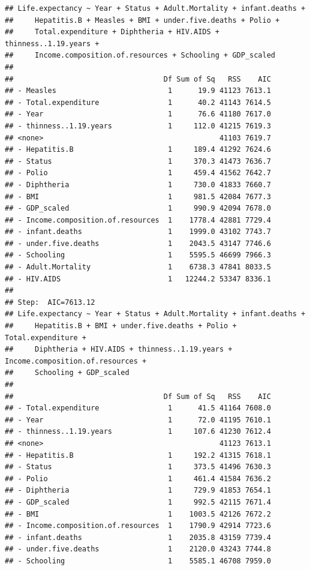 \documentclass[
]{article}
\begin{document}
\begin{verbatim}
## Life.expectancy ~ Year + Status + Adult.Mortality + infant.deaths + 
##     Hepatitis.B + Measles + BMI + under.five.deaths + Polio + 
##     Total.expenditure + Diphtheria + HIV.AIDS + thinness..1.19.years + 
##     Income.composition.of.resources + Schooling + GDP_scaled
## 
##                                   Df Sum of Sq   RSS    AIC
## - Measles                          1      19.9 41123 7613.1
## - Total.expenditure                1      40.2 41143 7614.5
## - Year                             1      76.6 41180 7617.0
## - thinness..1.19.years             1     112.0 41215 7619.3
## <none>                                         41103 7619.7
## - Hepatitis.B                      1     189.4 41292 7624.6
## - Status                           1     370.3 41473 7636.7
## - Polio                            1     459.4 41562 7642.7
## - Diphtheria                       1     730.0 41833 7660.7
## - BMI                              1     981.5 42084 7677.3
## - GDP_scaled                       1     990.9 42094 7678.0
## - Income.composition.of.resources  1    1778.4 42881 7729.4
## - infant.deaths                    1    1999.0 43102 7743.7
## - under.five.deaths                1    2043.5 43147 7746.6
## - Schooling                        1    5595.5 46699 7966.3
## - Adult.Mortality                  1    6738.3 47841 8033.5
## - HIV.AIDS                         1   12244.2 53347 8336.1
## 
## Step:  AIC=7613.12
## Life.expectancy ~ Year + Status + Adult.Mortality + infant.deaths + 
##     Hepatitis.B + BMI + under.five.deaths + Polio + Total.expenditure + 
##     Diphtheria + HIV.AIDS + thinness..1.19.years + Income.composition.of.resources + 
##     Schooling + GDP_scaled
## 
##                                   Df Sum of Sq   RSS    AIC
## - Total.expenditure                1      41.5 41164 7608.0
## - Year                             1      72.0 41195 7610.1
## - thinness..1.19.years             1     107.6 41230 7612.4
## <none>                                         41123 7613.1
## - Hepatitis.B                      1     192.2 41315 7618.1
## - Status                           1     373.5 41496 7630.3
## - Polio                            1     461.4 41584 7636.2
## - Diphtheria                       1     729.9 41853 7654.1
## - GDP_scaled                       1     992.5 42115 7671.4
## - BMI                              1    1003.5 42126 7672.2
## - Income.composition.of.resources  1    1790.9 42914 7723.6
## - infant.deaths                    1    2035.8 43159 7739.4
## - under.five.deaths                1    2120.0 43243 7744.8
## - Schooling                        1    5585.1 46708 7959.0

\end{verbatim}
\end{document}

